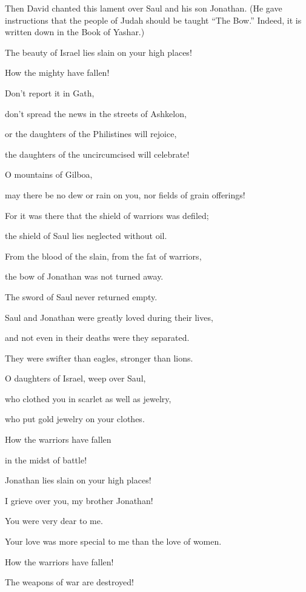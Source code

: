 {\par }{\PP {}Then David
chanted
this
lament
over
Saul
and his son
Jonathan.
(He gave instructions
that the people
of Judah
should be taught
“The Bow.”
Indeed,
it is written down
in
the Book
of Yashar.)
\par }{\Q {}The beauty
of Israel
lies slain
on
your high places!
\par }{\Q How
the mighty
have fallen!
\par }{\Q {}Don’t
report
it in Gath,
\par }{\Q don’t
spread the news
in the streets
of Ashkelon,
\par }{\Q or
the daughters
of the Philistines
will rejoice,
\par }{\Q the daughters
of the uncircumcised
will celebrate!
\par }{\Q {}O mountains
of Gilboa,
\par }{\Q may there be no
dew
or
rain
on
you, nor fields
of grain offerings!

\par }{\Q For
it was there
that the shield
of warriors
was defiled;
\par }{\Q the shield
of Saul
lies neglected
without
oil.
\par }{\Q {}From the blood
of the slain,
from the fat
of warriors,
\par }{\Q the bow
of Jonathan
was
not
turned away.
\par }{\Q The sword
of Saul
never
returned
empty.
\par }{\Q {}Saul
and Jonathan
were greatly loved
during
their lives,
\par }{\Q and not
even in their deaths
were they separated.
\par }{\Q They were swifter
than eagles,
stronger
than lions.
\par }{\Q {}O daughters
of Israel,
weep
over Saul,
\par }{\Q who clothed
you in scarlet
as well as
jewelry,
\par }{\Q who put gold
jewelry
on
your clothes.
\par }{\Q {}How
the warriors
have fallen
\par }{\Q in the midst
of battle!
\par }{\Q Jonathan
lies slain
on
your high places!
\par }{\Q {}I grieve
over
you, my brother
Jonathan!
\par }{\Q You were very
dear
to me.
\par }{\Q Your love
was more special
to me than the love
of women.
\par }{\Q {}How
the warriors
have fallen!
\par }{\Q The weapons
of war
are destroyed!

}
